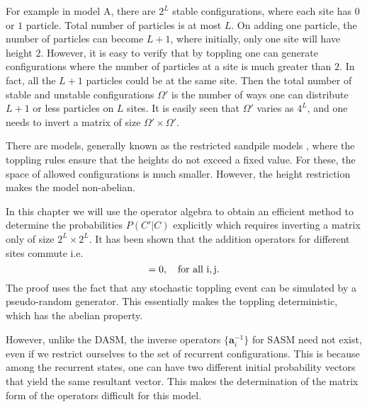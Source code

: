 \documentclass[11pt,a4paper]{book}
\begin{document}
For example in model A, there are $2^L$  stable configurations, 
where each site has $0$ or $1$ particle. Total number of particles is at 
most $L$. On adding one particle, the  number of 
particles can become $L+1$, where initially, only one site will have 
height $2$. However, it is easy to verify that by toppling one can 
generate configurations  where the number of particles at a site is much 
greater than $2$. In fact, all the $L+1$ particles could be at the same 
site. Then the total number of stable and unstable configurations  
$\Omega'$ is the number of 
ways one can distribute $L+1$ or less particles on $L$ sites. It is easily 
seen that $\Omega'$ varies as $4^L$, and one
needs to invert a matrix of size $\Omega' \times \Omega'$.

There are models, generally known as the restricted sandpile models
\cite{restr1,restr2,restr3}, where the toppling rules ensure that the heights do
not exceed a fixed value. For these, the space of allowed configurations
is much smaller. However, the height restriction makes the model
non-abelian.

In this chapter we will use the operator algebra
to obtain an efficient method to determine the probabilities $P(C'|C)$
explicitly which requires inverting a matrix only of size $2^L \times 2^L$.
It has been shown \cite{sasm} that the addition operators for different sites
commute i.e.
\begin{equation}
  [\mathbf{a}_i, \mathbf{a}_j] =0 \rm{,~ ~ ~ for ~ all ~} i,j.
\end{equation}
The proof uses the fact that any stochastic toppling event can be
simulated by a pseudo-random generator. This essentially makes the
toppling deterministic, which has the abelian property. 

However, unlike the DASM, the inverse operators $\{\mathbf{a}^{-1}_i\}$
for SASM need not exist, even if we restrict ourselves to the set of 
recurrent configurations. This is because among the recurrent
states, one can have two different
initial probability vectors that yield the same resultant vector.
This makes the determination of the matrix form of the operators
difficult for this model.
\end{document}
